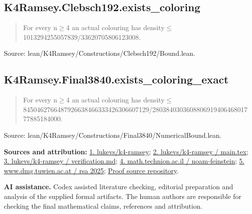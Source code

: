 \documentclass[11pt,a4paper]{article}
\begin{document}
\begin{samepage}
\subsection{K4Ramsey.Clebsch192.exists\_coloring}
\begin{quote}\small\ttfamily For every n\ensuremath{\geq}4 an actual colouring has density\ensuremath{\leq}1013294255057839/33620705806123008.\end{quote}
{\small Source: lean/K4Ramsey/Constructions/Clebsch192/Bound.lean.\par}

\end{samepage}
\begin{samepage}
\subsection{K4Ramsey.Final3840.exists\_coloring\_exact}
\begin{quote}\small\ttfamily For every n\ensuremath{\geq}4 an actual colouring has density\ensuremath{\leq}8450462766487926638466333426306607129/280384030360880691940646801777885184000.\end{quote}
{\small Source: lean/K4Ramsey/Constructions/Final3840/NumericalBound.lean.\par}

{\small\textbf{Sources and attribution:} \href{https://github.com/lukevs/k4-ramsey/tree/2cf216ba885fbb1b2d1b2d4920efeaa6ba438842}{1. lukevs/k4-ramsey}; \href{https://github.com/lukevs/k4-ramsey/blob/2cf216ba885fbb1b2d1b2d4920efeaa6ba438842/paper/main.tex}{2. lukevs/k4-ramsey / main.tex}; \href{https://github.com/lukevs/k4-ramsey/blob/2cf216ba885fbb1b2d1b2d4920efeaa6ba438842/docs/verification.md}{3. lukevs/k4-ramsey / verification.md}; \href{https://math.technion.ac.il/events/noam-feinstein/}{4. math.technion.ac.il / noam-feinstein}; \href{https://www.dmg.tuwien.ac.at/rsa2025/}{5. www.dmg.tuwien.ac.at / rsa 2025}; \href{https://github.com/alejandrozu/openmath-2026-judging}{Proof source repository}.\par}

\end{samepage}
{\small \textbf{AI assistance.} Codex assisted literature checking, editorial preparation and analysis of the supplied formal artifacts. The human authors are responsible for checking the final mathematical claims, references and attribution.\par}
\end{document}
